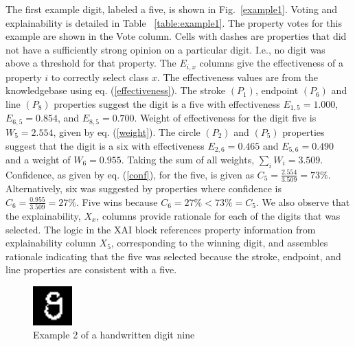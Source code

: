 \documentclass[conference]{IEEEtran}
\begin{document}
The first example digit, labeled a five, is shown in Fig.~\ref{example1}.  Voting and explainability is detailed in Table ~\ref{table:example1}.  The property votes for this example are shown in the Vote column.  Cells with dashes are properties that did not have a sufficiently strong opinion on a particular digit.  I.e., no digit was above a threshold for that property.   The $E_{i,x}$ columns give the effectiveness of a property $i$ to correctly select class $x$.  The effectiveness values are from the knowledgebase using eq. (\ref{effectiveness}).   The stroke $(P_1)$, endpoint $(P_6)$ and line $(P_8)$ properties suggest the digit is a five with effectiveness $E_{1,5}= 1.000$, $E_{6,5}=0.854$, and $E_{8,5}=0.700$.  Weight of effectiveness for the digit five is $W_5=2.554$, given by eq. (\ref{weight}).  The circle $(P_2)$ and $(P_5)$ properties suggest that the digit is a six with effectiveness $E_{2,6}=0.465$ and $E_{5,6}=0.490$  and a weight of $W_6=0.955$.  Taking the sum of all weights, $\sum\limits_i W_i=3.509$.  Confidence, as given by eq. (\ref{conf}), for the five, is given as $C_5=\frac{2.554}{3.509} = 73\%$.  Alternatively, six was suggested by properties where confidence is $C_6=\frac{0.955}{3.509}=27\%$.  Five wins because $C_6=27\% < 73\%=C_5$.  We also observe that the explainability, $X_x$, columns provide rationale for each of the digits that was selected.  The logic in the XAI block references property information from explainability column $X_5$, corresponding to the winning digit, and assembles rationale indicating that the five was selected because the stroke, endpoint, and line properties are consistent with a five. 

 \begin{figure}[htbp]
\centerline{\includegraphics[width=15mm]{./digit-images/9-9.png}}
\caption{Example 2 of a handwritten digit nine}
\label{example2}
\end{figure}

\end{document}

